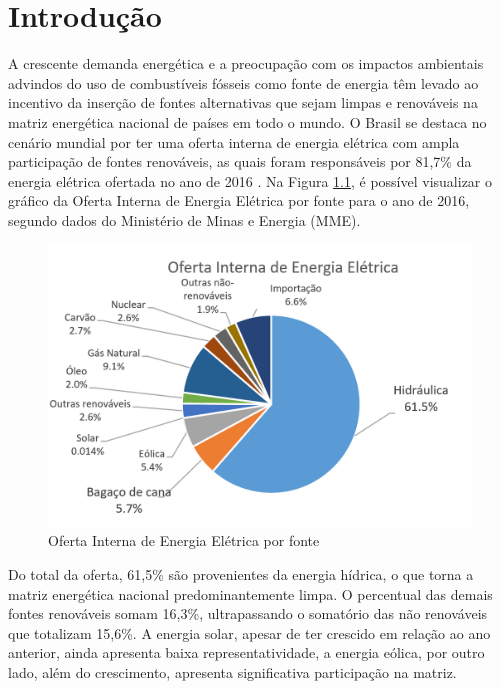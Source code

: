 \chapter[Introdução]{Introdução}

A crescente demanda energética e a preocupação com os impactos ambientais advindos do uso de combustíveis fósseis como fonte de energia têm levado ao incentivo da inserção de fontes alternativas que sejam limpas e renováveis na matriz energética nacional de países em todo o mundo. O Brasil se destaca no cenário mundial por ter uma oferta interna de energia elétrica com ampla participação de fontes renováveis, as quais foram responsáveis por 81,7\% da energia elétrica ofertada no ano de 2016 \cite{mme2017}. Na Figura \ref{figura_matriz}, é possível visualizar o gráfico da Oferta Interna de Energia Elétrica por fonte para o ano de 2016, segundo dados do Ministério de Minas e Energia (MME).

\begin{figure}[!htb]
	\centering
	\includegraphics{OIEE}
	\caption{Oferta Interna de Energia Elétrica por fonte \cite{mme2017}}
	\label{figura_matriz}
\end{figure}

Do total da oferta, 61,5\% são provenientes da energia hídrica, o que torna a matriz energética nacional predominantemente limpa. O percentual das demais fontes renováveis somam 16,3\%, ultrapassando o somatório das não renováveis que totalizam 15,6\%. A energia solar, apesar de ter crescido em relação ao ano anterior, ainda apresenta baixa representatividade, a energia eólica, por outro lado, além do crescimento, apresenta significativa participação na matriz.

